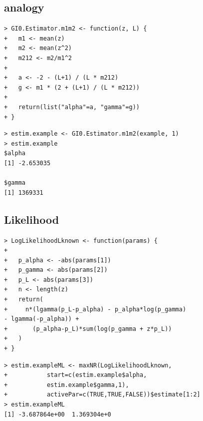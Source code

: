 \documentclass{article}
\begin{document}
\subsection{analogy}
\begin{lstlisting}[frame=tb]
> GI0.Estimator.m1m2 <- function(z, L) {
+   m1 <- mean(z)
+   m2 <- mean(z^2)
+   m212 <- m2/m1^2
+
+   a <- -2 - (L+1) / (L * m212)
+   g <- m1 * (2 + (L+1) / (L * m212))
+
+   return(list("alpha"=a, "gamma"=g))
+ }
\end{lstlisting}
\begin{lstlisting}[frame=tb]
> estim.example <- GI0.Estimator.m1m2(example, 1)
> estim.example
$alpha
[1] -2.653035

$gamma
[1] 1369331
\end{lstlisting}
\subsection{Likelihood}
\begin{lstlisting}[frame=tb]
> LogLikelihoodLknown <- function(params) {
+
+   p_alpha <- -abs(params[1])
+   p_gamma <- abs(params[2])
+   p_L <- abs(params[3])
+   n <- length(z)
+   return(
+     n*(lgamma(p_L-p_alpha) - p_alpha*log(p_gamma)
- lgamma(-p_alpha)) +
+       (p_alpha-p_L)*sum(log(p_gamma + z*p_L))
+   )
+ }
\end{lstlisting}
\begin{lstlisting}[frame=tb]
> estim.exampleML <- maxNR(LogLikelihoodLknown,
+			start=c(estim.example$alpha,
+			estim.example$gamma,1),
+			activePar=c(TRUE,TRUE,FALSE))$estimate[1:2]
> estim.exampleML
[1] -3.687864e+00  1.369304e+0
\end{lstlisting}
\end{document}
